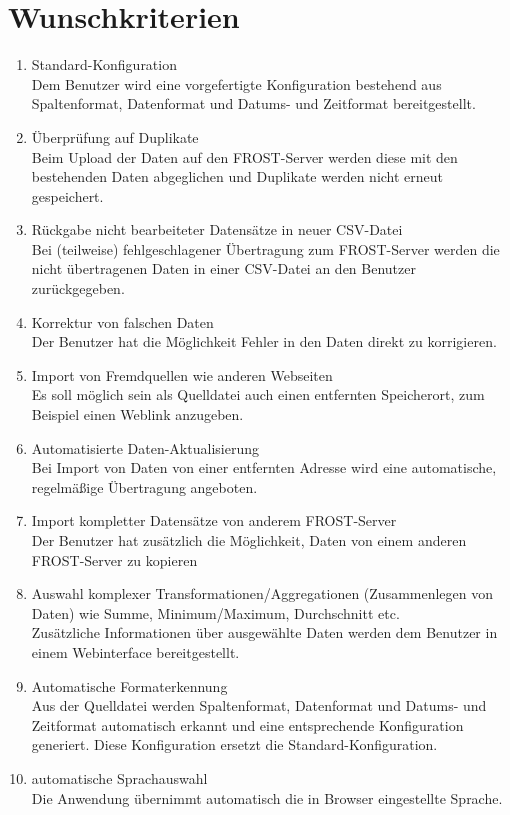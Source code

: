 \documentclass[12 pt]{article}
\begin{document}
\section{Wunschkriterien}
\begin{enumerate}
	\item Standard-Konfiguration \\
	Dem Benutzer wird eine vorgefertigte Konfiguration bestehend aus Spaltenformat, Datenformat und Datums- und Zeitformat bereitgestellt.
	\item Überprüfung auf Duplikate \\
	Beim Upload der Daten auf den FROST-Server werden diese mit den bestehenden Daten abgeglichen und Duplikate werden nicht erneut gespeichert.
	\item Rückgabe nicht bearbeiteter Datensätze in neuer CSV-Datei \\
	Bei (teilweise) fehlgeschlagener Übertragung zum FROST-Server werden die nicht übertragenen Daten in einer CSV-Datei an den Benutzer zurückgegeben.
	\item Korrektur von falschen Daten \\
	Der Benutzer hat die Möglichkeit Fehler in den Daten direkt zu korrigieren.
	\item Import von Fremdquellen wie anderen Webseiten \\
	Es soll möglich sein als Quelldatei auch einen entfernten Speicherort, zum Beispiel einen Weblink  anzugeben.
	\item Automatisierte Daten-Aktualisierung \\
	Bei Import von Daten von einer entfernten Adresse wird eine automatische, regelmäßige Übertragung angeboten.
	\item Import kompletter Datensätze von anderem FROST-Server \\
	Der Benutzer hat zusätzlich die Möglichkeit, Daten von einem anderen FROST-Server zu kopieren
	\item Auswahl komplexer Transformationen/Aggregationen (Zusammenlegen von Daten) wie Summe, Minimum/Maximum, Durchschnitt etc.\\ 
	Zusätzliche Informationen über ausgewählte Daten werden dem Benutzer in einem Webinterface bereitgestellt.
	\item Automatische Formaterkennung \\
	Aus der Quelldatei werden Spaltenformat, Datenformat und Datums- und Zeitformat automatisch erkannt und eine entsprechende Konfiguration generiert.
	Diese Konfiguration ersetzt die Standard-Konfiguration.
	\item automatische Sprachauswahl \\
	Die Anwendung übernimmt automatisch die in Browser eingestellte Sprache.
	
	
	
\end{enumerate}
\end{document}
